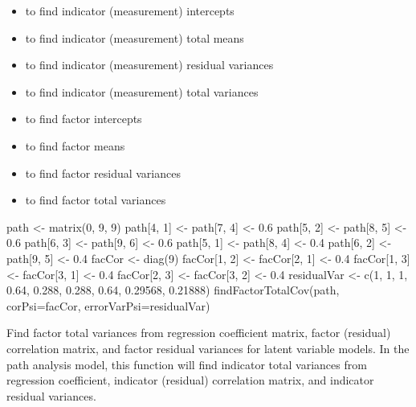 \documentclass[a4paper]{book}
\begin{document}
\begin{SeeAlso}\relax
\begin{itemize}

\item {} to find indicator (measurement) intercepts
\item {} to find indicator (measurement) total means
\item {} to find indicator (measurement) residual variances
\item {} to find indicator (measurement) total variances
\item {} to find factor intercepts
\item {} to find factor means
\item {} to find factor residual variances
\item {} to find factor total variances

\end{itemize}

\end{SeeAlso}
%
\begin{Examples}
\begin{ExampleCode}
path <- matrix(0, 9, 9)
path[4, 1] <- path[7, 4] <- 0.6
path[5, 2] <- path[8, 5] <- 0.6
path[6, 3] <- path[9, 6] <- 0.6
path[5, 1] <- path[8, 4] <- 0.4
path[6, 2] <- path[9, 5] <- 0.4
facCor <- diag(9)
facCor[1, 2] <- facCor[2, 1] <- 0.4
facCor[1, 3] <- facCor[3, 1] <- 0.4
facCor[2, 3] <- facCor[3, 2] <- 0.4
residualVar <- c(1, 1, 1, 0.64, 0.288, 0.288, 0.64, 0.29568, 0.21888)
findFactorTotalCov(path, corPsi=facCor, errorVarPsi=residualVar)
\end{ExampleCode}
\end{Examples}
%
\begin{Description}\relax
Find factor total variances from regression coefficient matrix, factor (residual) correlation matrix, and factor residual variances  for latent variable models. In the path analysis model, this function will find indicator total variances from regression coefficient, indicator (residual) correlation matrix, and indicator residual variances. 
\end{Description}
\end{document}
